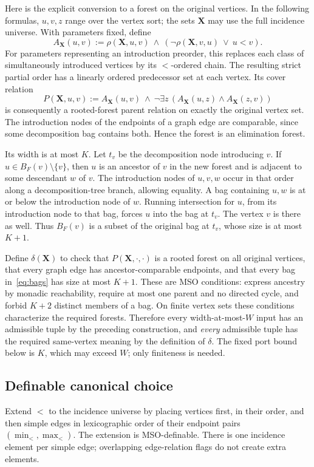 \documentclass[11pt]{article}
\theoremstyle{definition}\newtheorem{definition}[theorem]{Definition}
\theoremstyle{remark}\newtheorem{remark}[theorem]{Remark}
\begin{document}
Here is the explicit conversion to a forest on the original vertices. In the following formulas, $u,v,z$ range over the vertex sort; the sets $\mathbf X$ may use the full incidence universe. With parameters fixed, define
\[
 A_{\mathbf X}(u,v):=\rho(\mathbf X,u,v)\ \wedge\
       (\neg\rho(\mathbf X,v,u)\ \vee\ u<v).
\]
For parameters representing an introduction preorder, this replaces each class of simultaneously introduced vertices by its $<$-ordered chain. The resulting strict partial order has a linearly ordered predecessor set at each vertex. Its cover relation
\[
 P(\mathbf X,u,v):=A_{\mathbf X}(u,v)\ \wedge\
       \neg\exists z\,(A_{\mathbf X}(u,z)\wedge A_{\mathbf X}(z,v))
\]
is consequently a rooted-forest parent relation on exactly the original vertex set. The introduction nodes of the endpoints of a graph edge are comparable, since some decomposition bag contains both. Hence the forest is an elimination forest.

Its width is at most $K$. Let $t_v$ be the decomposition node introducing $v$. If $u\in B_F(v)\setminus\{v\}$, then $u$ is an ancestor of $v$ in the new forest and is adjacent to some descendant $w$ of $v$. The introduction nodes of $u,v,w$ occur in that order along a decomposition-tree branch, allowing equality. A bag containing $u,w$ is at or below the introduction node of $w$. Running intersection for $u$, from its introduction node to that bag, forces $u$ into the bag at $t_v$. The vertex $v$ is there as well. Thus $B_F(v)$ is a subset of the original bag at $t_v$, whose size is at most $K+1$.

Define $\delta(\mathbf X)$ to check that $P(\mathbf X,\cdot,\cdot)$ is a rooted forest on all original vertices, that every graph edge has ancestor-comparable endpoints, and that every bag in~\eqref{eq:bags} has size at most $K+1$. These are MSO conditions: express ancestry by monadic reachability, require at most one parent and no directed cycle, and forbid $K+2$ distinct members of a bag. On finite vertex sets these conditions characterize the required forests. Therefore every width-at-most-$W$ input has an admissible tuple by the preceding construction, and \emph{every} admissible tuple has the required same-vertex meaning by the definition of $\delta$. The fixed port bound below is $K$, which may exceed $W$; only finiteness is needed.

\subsection{Definable canonical choice}
Extend $<$ to the incidence universe by placing vertices first, in their order, and then simple edges in lexicographic order of their endpoint pairs $(\min_{<},\max_{<})$. The extension is MSO-definable. There is one incidence element per simple edge; overlapping edge-relation flags do not create extra elements.
\end{document}
